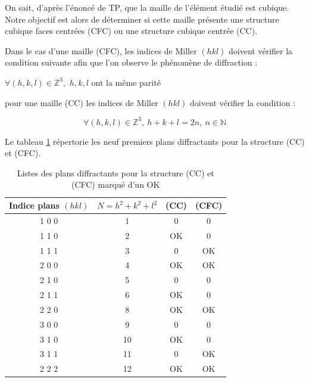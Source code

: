 \begin{flushleft}
	On sait, d'après l'énoncé de  TP, que la maille de l'élément étudié est cubique. Notre objectif est alors de déterminer si cette maille présente une structure cubique faces centrées (CFC) ou une structure cubique centrée (CC).
	
	
	Dans le cas d’une maille (CFC), les indices de Miller $(h k l)$ doivent vérifier la condition
	suivante afin que l’on observe le phénomène de diffraction : 
	\begin{center} 
		$\forall (h,k,l)\in \mathbb{Z}^3,$  $h,k,l$ ont la même parité 
	\end{center}
	
	pour une  maille (CC) les indices de Miller $(h k l)$ doivent vérifier la condition : 
	
	\begin{equation}
		\forall (h,k,l)\in \mathbb{Z}^3, \ 	h + k + l = 2n, \ n \in \mathbb{N}
	\end{equation}


\newpage
Le tableau \ref{tab:Listes des plans diffractants pour la structure (CC) et (CFC) marqué d’un "OK"} répertorie les neuf premiers plans diffractants pour la structure (CC) et (CFC).
\begin{table}[h!]
	\centering
	\begin{tabular}{|c|c|c|c|}
		\hline
		\textbf{Indice plans $(h k l)$} & \textbf{$N=h^2+k^2+l^2$} & \textbf{(CC)} & \textbf{(CFC)} \\
		\hline
		1 0 0 & 1 & 0 & 0 \\
		\hline
		1 1 0 & 2 & \textcolor{myred}{OK }& 0 \\
		\hline
		1 1 1 & 3 & 0 & \textcolor{myred}{OK } \\
		\hline
		2 0 0 & 4 & \textcolor{myred}{OK } & \textcolor{myred}{OK } \\
		\hline
		2 1 0 & 5 & 0 & 0 \\
		\hline
		2 1 1 & 6 & \textcolor{myred}{OK } & 0 \\
		\hline
		2 2 0 & 8 & \textcolor{myred}{OK } & \textcolor{myred}{OK } \\
		\hline
		3 0 0 & 9 & 0 & 0 \\
		\hline
		3 1 0 & 10 & \textcolor{myred}{OK } & 0 \\
		\hline
		3 1 1 & 11 & 0 & \textcolor{myred}{OK } \\
		\hline
		2 2 2 & 12 & \textcolor{myred}{OK } & \textcolor{myred}{OK } \\
		\hline
	\end{tabular}
	\caption{Listes des plans diffractants pour la structure (CC) et (CFC) marqué d’un \textcolor{myred}{OK}}
	\label{tab:Listes des plans diffractants pour la structure (CC) et (CFC) marqué d’un "OK"}
\end{table}



\end{flushleft}
